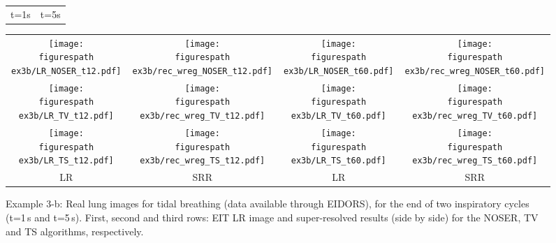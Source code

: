 \documentclass[10pt]{IEEEtran}
\newcommand{\figurespath}{figs/}
\begin{document}
\renewcommand{\sizeA}{3.5}%
\begin{figure*}[!htb] %
\begin{center}
\begin{tabular}{cc}
  t=1s \hspace{\sizeA cm} & \hspace{\sizeA cm}  t=5s
\end{tabular}
%
\begin{tabular}{cc||cc}
  \texttt{[image: \\figurespath ex3b/LR\_NOSER\_t12.pdf]}  &
  \texttt{[image: \\figurespath ex3b/rec\_wreg\_NOSER\_t12.pdf]} &
  \texttt{[image: \\figurespath ex3b/LR\_NOSER\_t60.pdf]}  &
  \texttt{[image: \\figurespath ex3b/rec\_wreg\_NOSER\_t60.pdf]}\\
  \texttt{[image: \\figurespath ex3b/LR\_TV\_t12.pdf]}  &
  \texttt{[image: \\figurespath ex3b/rec\_wreg\_TV\_t12.pdf]} &
  \texttt{[image: \\figurespath ex3b/LR\_TV\_t60.pdf]}  &
  \texttt{[image: \\figurespath ex3b/rec\_wreg\_TV\_t60.pdf]}\\
  \texttt{[image: \\figurespath ex3b/LR\_TS\_t12.pdf]}  &
  \texttt{[image: \\figurespath ex3b/rec\_wreg\_TS\_t12.pdf]} &
  \texttt{[image: \\figurespath ex3b/LR\_TS\_t60.pdf]}  &
  \texttt{[image: \\figurespath ex3b/rec\_wreg\_TS\_t60.pdf]} \\
  LR   &   SRR  &  LR  &  SRR
\end{tabular}
\end{center}
\caption{Example 3-b: Real lung images for tidal breathing (data available through EIDORS), for the end of two inspiratory cycles (t=1\,s and t=5\,s). First, second and third rows: EIT LR image and super-resolved results (side by side) for the NOSER, TV and TS algorithms, respectively.}
\label{ex3b_results}
\end{figure*}
\end{document}
